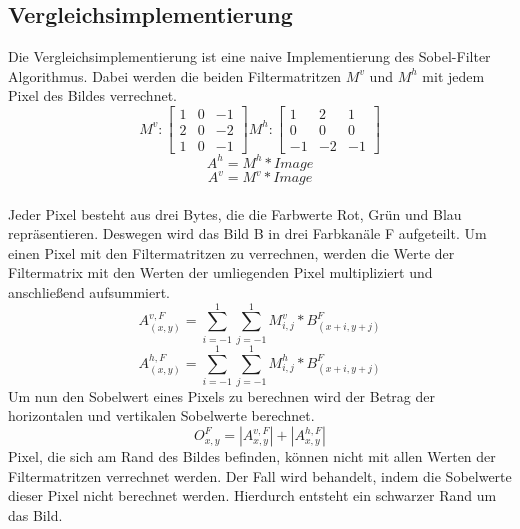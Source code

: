 \documentclass[course=erap]{aspdoc}
\begin{document}
\subsection{Vergleichsimplementierung}
\label{sec:vergleichsimplementierung}
Die Vergleichsimplementierung ist eine naive Implementierung des Sobel-Filter Algorithmus.
Dabei werden die beiden Filtermatritzen $M^{v}$ und $M^{h}$ mit jedem Pixel des Bildes verrechnet.
\begin{equation}
    M^{v} :
    \begin{bmatrix}
        1 & 0 & -1 \\
        2 & 0 & -2 \\
        1 & 0 & -1
    \end{bmatrix}
    M^{h} :
    \begin{bmatrix}
        1 & 2 & 1 \\
        0 & 0 & 0 \\
        -1 & -2 & -1
    \end{bmatrix}
\end{equation}
\begin{equation}
    A^{h} = M^{h} * Image
\end{equation}
\begin{equation}
    A^{v} = M^{v} * Image
\end{equation} \\
Jeder Pixel besteht aus drei Bytes, die die Farbwerte Rot, Grün und Blau repräsentieren.
Deswegen wird das Bild B in drei Farbkanäle F aufgeteilt.
Um einen Pixel mit den Filtermatritzen zu verrechnen, werden die Werte der Filtermatrix mit den Werten der umliegenden Pixel multipliziert und anschließend aufsummiert.
\begin{equation}
    A_(x,y)^{v,F} = \sum_{i=-1}^{1} \sum_{j=-1}^{1} M^{v}_{i,j} * B_{(x+i,y+j)}^{F}
\end{equation}
\begin{equation}
    A_(x,y)^{h,F} = \sum_{i=-1}^{1} \sum_{j=-1}^{1} M^{h}_{i,j} * B_{(x+i,y+j)}^{F}
\end{equation}
Um nun den Sobelwert eines Pixels zu berechnen wird der Betrag der horizontalen und vertikalen Sobelwerte berechnet.
\begin{equation}
    O^{F}_{x,y} = \left | A^{v,F}_{x,y} \right | + \left | A^{h,F}_{x,y} \right |
    \label{eq:betrag}
\end{equation}
Pixel, die sich am Rand des Bildes befinden, können nicht mit allen Werten der Filtermatritzen verrechnet werden.
Der Fall wird behandelt, indem die Sobelwerte dieser Pixel nicht berechnet werden. Hierdurch entsteht ein schwarzer Rand um das Bild.
\end{document}
